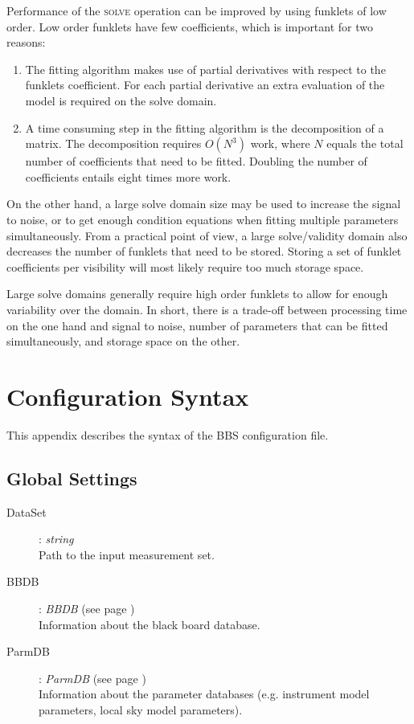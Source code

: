 \documentclass[10pt]{lofar}
\newcommand{\solve}{\textsc{solve}\xspace}
\begin{document}
Performance of the \solve operation can be improved by using funklets of low
order. Low order funklets have few coefficients, which is important for two
reasons:

\begin{enumerate}
\item The fitting algorithm makes use of partial derivatives with respect to the
funklets coefficient. For each partial derivative an extra evaluation of the
model is required on the solve domain.
\item A time consuming step in the fitting algorithm is the decomposition of a
matrix. The decomposition requires $O(N^3)$ work, where $N$ equals the total
number of coefficients that need to be fitted. Doubling the number of
coefficients entails eight times more work.
\end{enumerate}

On the other hand, a large solve domain size may be used to increase the signal
to noise, or to get enough condition equations when fitting multiple parameters
simultaneously. From a practical point of view, a large solve/validity domain
also decreases the number of funklets that need to be stored. Storing a set of
funklet coefficients per visibility will most likely require too much storage
space.

Large solve domains generally require high order funklets to allow for enough
variability over the domain. In short, there is a trade-off between processing
time on the one hand and signal to noise, number of parameters that can be
fitted simultaneously, and storage space on the other.

\cleardoublepage




\cleardoublepage

\appendix
\section{Configuration Syntax}
\label{sec:configuration-syntax}

This appendix describes the syntax of the BBS configuration file.

\subsection*{Global Settings}
\begin{description}
\item [DataSet] : \emph{string} \\
    Path to the input measurement set.
\item [BBDB] : \emph{BBDB} (see page \pageref{app-bbdb}) \\
    Information about the black board database.
\item [ParmDB] : \emph{ParmDB} (see page \pageref{app-parmdb}) \\
    Information about the parameter databases (e.g. instrument model parameters,
    local sky model parameters).
\end{description}
\end{document}
